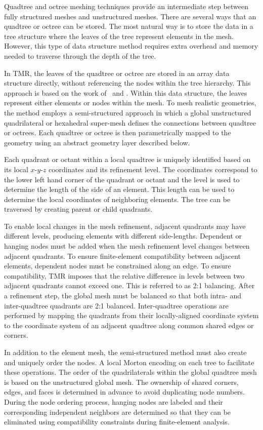 \documentclass[12pt]{article}
\begin{document}
Quadtree and octree meshing techniques provide an intermediate step between fully structured meshes and unstructured meshes. 
There are several ways that an quadtree or octree can be stored.
The most natural way is to store the data in a tree structure where the leaves of the tree represent elements in the mesh.
However, this type of data structure method requires extra overhead and memory needed to traverse through the depth of the tree.

In TMR, the leaves of the quadtree or octree are stored in an array data structure directly, without referencing the nodes within the tree hierarchy. 
This approach is based on the work of~\citet{BursteddeWilcoxGhattas11} and \citet{IsaacBursteddeWilcoxEtAl15}.
Within this data structure, the leaves represent either elements or nodes within the mesh.
To mesh realistic geometries, the method employs a semi-structured approach in which a global unstructured quadrilateral or hexahedral super-mesh defines the connections between quadtree or octrees.
Each quadtree or octree is then parametrically mapped to the geometry using an abstract geometry layer described below.

Each quadrant or octant within a local quadtree is uniquely identified based on its local $x$-$y$-$z$ coordinates and its refinement level. 
The coordinates correspond to the lower left hand corner of the quadrant or octant and the level is used to determine the length of the side of an element. 
This length can be used to determine the local coordinates of neighboring elements.
The tree can be traversed by creating parent or child quadrants. 

To enable local changes in the mesh refinement, adjacent quadrants may have different levels, producing elements with different side-lengths.
Dependent or hanging nodes must be added when the mesh refinement level changes between adjacent quadrants. 
To ensure finite-element compatibility between adjacent elements, dependent nodes must be constrained along an edge.  
To ensure compatibility, TMR imposes that the relative difference in levels between two adjacent quadrants cannot exceed one. 
This is referred to as 2:1 balancing. 
After a refinement step, the global mesh must be balanced so that both intra- and inter-quadtree quadrants are 2:1 balanced. 
Inter-quadtree operations are performed by mapping the quadrants from their locally-aligned coordinate system to the coordinate system of an adjacent quadtree along common shared edges or corners.

In addition to the element mesh, the semi-structured method must also create and uniquely order the nodes. 
A local Morton encoding on each tree to facilitate these operations. 
The order of the quadrilaterals within the global quadtree mesh is based on the unstructured global mesh. 
The ownership of shared corners, edges, and faces is determined in advance to avoid duplicating node numbers. 
During the node ordering process, hanging nodes are labeled and their corresponding independent neighbors are determined so that they can be eliminated using compatibility constraints during finite-element analysis.
\end{document}
